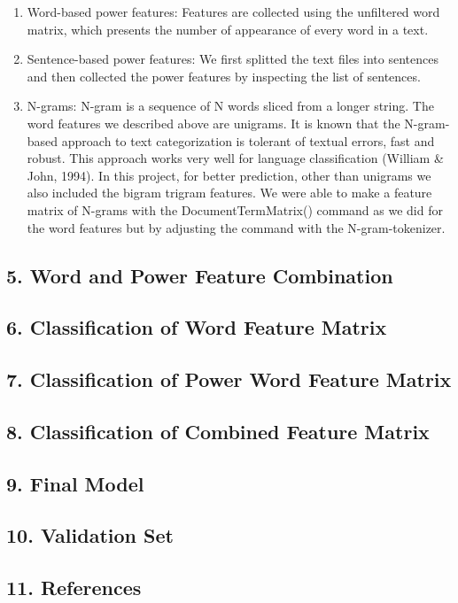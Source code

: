 \documentclass[]{article}
\begin{document}
\begin{enumerate}
\def\labelenumi{(\arabic{enumi})}
\item
  Word-based power features: Features are collected using the unfiltered
  word matrix, which presents the number of appearance of every word in
  a text.
\item
  Sentence-based power features: We first splitted the text files into
  sentences and then collected the power features by inspecting the list
  of sentences.
\item
  N-grams: N-gram is a sequence of N words sliced from a longer string.
  The word features we described above are unigrams. It is known that
  the N-gram-based approach to text categorization is tolerant of
  textual errors, fast and robust. This approach works very well for
  language classification (William \& John, 1994). In this project, for
  better prediction, other than unigrams we also included the bigram
  trigram features. We were able to make a feature matrix of N-grams
  with the DocumentTermMatrix() command as we did for the word features
  but by adjusting the command with the N-gram-tokenizer.
\end{enumerate}

\subsection{{5. Word and Power Feature
Combination}}\label{word-and-power-feature-combination}

\subsection{{6. Classification of Word Feature
Matrix}}\label{classification-of-word-feature-matrix}

\subsection{{7. Classification of Power Word Feature
Matrix}}\label{classification-of-power-word-feature-matrix-1}

\subsection{{8. Classification of Combined Feature
Matrix}}\label{classification-of-combined-feature-matrix}

\subsection{{9. Final Model}}\label{final-model}

\subsection{{10. Validation Set}}\label{validation-set}

\subsection{{11. References}}\label{references}
\end{document}
